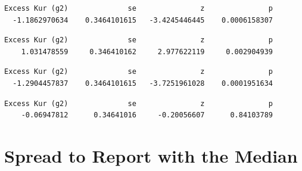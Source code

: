 \documentclass[
  letterpaper,
  DIV=11,
  numbers=noendperiod]{scrreprt}
\newenvironment{Shaded}{\begin{snugshade}}{\end{snugshade}}
\newcommand{\CommentTok}[1]{\textcolor[rgb]{0.37,0.37,0.37}{#1}}
\newcommand{\FunctionTok}[1]{\textcolor[rgb]{0.28,0.35,0.67}{#1}}
\newcommand{\NormalTok}[1]{\textcolor[rgb]{0.00,0.23,0.31}{#1}}
\newcommand{\SpecialCharTok}[1]{\textcolor[rgb]{0.37,0.37,0.37}{#1}}
\begin{document}
\begin{verbatim}
Excess Kur (g2)              se               z               p 
  -1.1862970634    0.3464101615   -3.4245446445    0.0006158307 
\end{verbatim}

\begin{Shaded}
\end{Shaded}

\begin{verbatim}
Excess Kur (g2)              se               z               p 
    1.031478559     0.346410162     2.977622119     0.002904939 
\end{verbatim}

\begin{Shaded}
\end{Shaded}

\begin{verbatim}
Excess Kur (g2)              se               z               p 
  -1.2904457837    0.3464101615   -3.7251961028    0.0001951634 
\end{verbatim}

\begin{Shaded}
\end{Shaded}

\begin{verbatim}
Excess Kur (g2)              se               z               p 
    -0.06947812      0.34641016     -0.20056607      0.84103789 
\end{verbatim}

\section{Spread to Report with the
Median}\label{spread-to-report-with-the-median}
\end{document}

